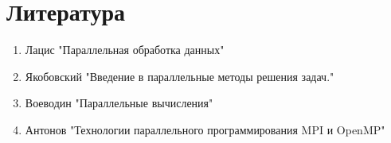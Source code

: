 \documentclass[11pt]{article}
\author{Sergey Makarov}
\date{\today}
\title{}
\begin{document}
\tableofcontents

\section{Литература}
\label{sec:org7e9019b}
\begin{enumerate}
\item Лацис "Параллельная обработка данных"
\item Якобовский "Введение в параллельные методы решения задач."
\item Воеводин "Параллельные вычисления"
\item Антонов "Технологии параллельного программирования MPI и OpenMP"
\end{enumerate}
\end{document}
